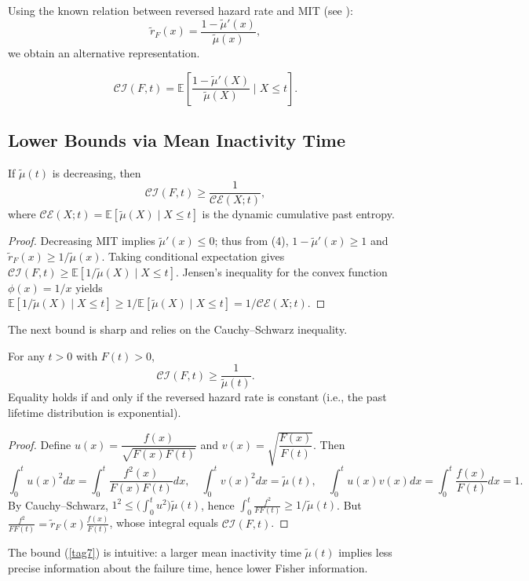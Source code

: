 \documentclass[twoside]{article}
\begin{document}
Using the known relation between reversed hazard rate and MIT (see \cite{di2009cumulative}):
\begin{equation*}
\tilde{r}_F(x)=\frac{1-\tilde{\mu}'(x)}{\tilde{\mu}(x)}, \tag{4}
\end{equation*}
we obtain an alternative representation.
\begin{cor}
	\begin{equation*}
	\mathcal{CI}(F,t)=\mathbb{E}\left[\frac{1-\tilde{\mu}'(X)}{\tilde{\mu}(X)}\;\Big|\;X\le t\right]. \nonumber
		\end{equation*}
\end{cor}
\subsection{Lower Bounds via Mean Inactivity Time}

\begin{thm}
	If $\tilde{\mu}(t)$ is decreasing, then
	\begin{equation}
	\mathcal{CI}(F,t)\ge \frac{1}{\mathcal{CE}(X;t)}, \tag{6}
	\end{equation}
	where $\mathcal{CE}(X;t)=\mathbb{E}[\tilde{\mu}(X)\mid X\le t]$ is the dynamic cumulative past entropy.
\end{thm}
\begin{proof}
	Decreasing MIT implies $\tilde{\mu}'(x)\le0$; thus from (4), $1-\tilde{\mu}'(x)\ge1$ and $\tilde{r}_F(x)\ge1/\tilde{\mu}(x)$. Taking conditional expectation gives $\mathcal{CI}(F,t)\ge\mathbb{E}[1/\tilde{\mu}(X)\mid X\le t]$. Jensen’s inequality for the convex function $\phi(x)=1/x$ yields $\mathbb{E}[1/\tilde{\mu}(X)\mid X\le t]\ge 1/\mathbb{E}[\tilde{\mu}(X)\mid X\le t]=1/\mathcal{CE}(X;t)$.
\end{proof}

The next bound is sharp and relies on the Cauchy–Schwarz inequality.
\begin{thm}
	For any $t>0$ with $F(t)>0$,
	\begin{equation}
	\label{tag7}
	\mathcal{CI}(F,t)\ge \frac{1}{\tilde{\mu}(t)}. \tag{7}
	\end{equation}
	Equality holds if and only if the reversed hazard rate is constant (i.e., the past lifetime distribution is exponential).
\end{thm}
\begin{proof}
	Define $u(x)=\dfrac{f(x)}{\sqrt{F(x)F(t)}}$ and $v(x)=\sqrt{\dfrac{F(x)}{F(t)}}$. Then
	$$
	\int_0^t u(x)^2dx = \int_0^t \frac{f^2(x)}{F(x)F(t)}dx,\quad
	\int_0^t v(x)^2dx = \tilde{\mu}(t),\quad
	\int_0^t u(x)v(x)dx = \int_0^t \frac{f(x)}{F(t)}dx =1.
	$$
	By Cauchy–Schwarz, $1^2 \le \bigl(\int_0^t u^2\bigr)\tilde{\mu}(t)$, hence $\int_0^t \frac{f^2}{F F(t)} \ge 1/\tilde{\mu}(t)$. But $\frac{f^2}{F F(t)} = \tilde{r}_F(x)\frac{f(x)}{F(t)}$, whose integral equals $\mathcal{CI}(F,t)$.
\end{proof}
\begin{rem}
	The bound (\ref{tag7}) is intuitive: a larger mean inactivity time $\tilde{\mu}(t)$ implies less precise information about the failure time, hence lower Fisher information.
\end{rem}
\end{document}
